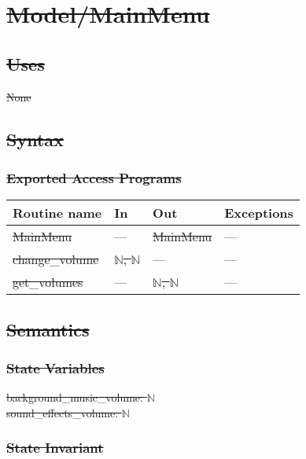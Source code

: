 \documentclass[12pt]{article}
\begin{document}
\newpage
\section*{\sout{Model/MainMenu}}

\subsection* {\sout{Uses}}
\sout{None}

\subsection* {\sout{Syntax}}

\subsubsection* {\sout{Exported Access Programs}}

\begin{tabular}{| l | l | l | l |}
\hline
\textbf{Routine name} & \textbf{In} & \textbf{Out} & \textbf{Exceptions}\\
\hline
    \sout{MainMenu} & --- & \sout{MainMenu} & ---\\
\hline
    \sout{change\_volume} & \sout{$\mathbb{N}$, $\mathbb{N}$} & --- & ---\\
\hline
    \sout{get\_volumes} & --- & \sout{$\mathbb{N}$, $\mathbb{N}$} & ---\\
\hline
\end{tabular}

\subsection* {\sout{Semantics}}

\subsubsection* {\sout{State Variables}}

\sout{background\_music\_volume: $\mathbb{N}$\\}
\sout{sound\_effects\_volume: $\mathbb{N}$}

\subsubsection* {\sout{State Invariant}}
\end{document}
